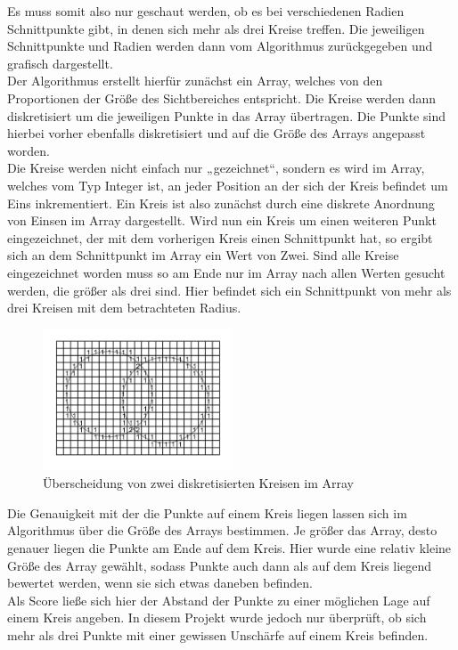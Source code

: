 \documentclass[a4paper,twocolumn]{scrartcl}
\begin{document}
Es muss somit also nur geschaut werden, ob es bei verschiedenen Radien Schnittpunkte gibt, in denen sich mehr als drei Kreise treffen. Die jeweiligen Schnittpunkte und Radien werden dann vom Algorithmus zurückgegeben und grafisch dargestellt.\\
Der Algorithmus erstellt hierfür zunächst ein Array, welches von den Proportionen der Größe des Sichtbereiches entspricht. Die Kreise werden dann diskretisiert um die jeweiligen Punkte in das Array übertragen. Die Punkte sind hierbei vorher ebenfalls diskretisiert und auf die Größe des Arrays angepasst worden.\\
Die Kreise werden nicht einfach nur „gezeichnet“, sondern es wird im Array, welches vom Typ Integer ist, an jeder Position an der sich der Kreis befindet um Eins inkrementiert. Ein Kreis ist also zunächst durch eine diskrete Anordnung von Einsen im Array dargestellt. Wird nun ein Kreis um einen weiteren Punkt eingezeichnet, der mit dem vorherigen Kreis einen Schnittpunkt hat, so ergibt sich an dem Schnittpunkt im Array ein Wert von Zwei. Sind alle Kreise eingezeichnet worden muss so am Ende nur im Array nach allen Werten gesucht werden, die größer als drei sind. Hier befindet sich ein Schnittpunkt von mehr als drei Kreisen mit dem betrachteten Radius.

\begin{figure}[h]
\centering
\includegraphics[width=0.5\textwidth]{Bilder/diskret}
\caption{Überscheidung von zwei diskretisierten Kreisen im Array}
\label{img:diskret}
\end{figure}

Die Genauigkeit mit der die Punkte auf einem Kreis liegen lassen sich im Algorithmus über die Größe des Arrays bestimmen. Je größer das Array, desto genauer liegen die Punkte am Ende auf dem Kreis. Hier wurde eine relativ kleine Größe des Array gewählt, sodass Punkte auch dann als auf dem Kreis liegend bewertet werden, wenn sie sich etwas daneben befinden.\\
Als Score ließe sich hier der Abstand der Punkte zu einer möglichen Lage auf einem Kreis angeben. In diesem Projekt wurde jedoch nur überprüft, ob sich mehr als drei Punkte mit einer gewissen Unschärfe auf einem Kreis befinden.
\end{document}
